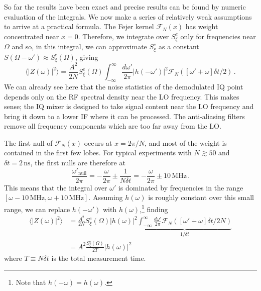 So far the results have been exact and precise results can be found by numeric evaluation of the integrals.
We now make a series of relatively weak assumptions to arrive at a practical formula.
The Fejer kernel $\mathcal{F}_N(x)$ has weight concentrated near $x=0$.
Therefore, we integrate over $S^e_\xi$ only for frequencies near $\Omega$ and so, in this integral, we can approximate $S^e_\xi$ as a constant $S(\Omega - \omega') \approx S^e_\xi(\Omega)$, giving
\begin{equation}
\langle |Z(\omega)|^2 \rangle =
\frac{A^2}{2N} S^e_\xi(\Omega) \int_{-\infty}^\infty \frac{d\omega'}{2\pi} |h(-\omega')|^2 \mathcal{F}_N([\omega' + \omega]\delta t / 2) \, .
\end{equation}
We can already see here that the noise statistics of the demodulated IQ point depends only on the RF spectral density near the LO frequency.
This makes sense; the IQ mixer is designed to take signal content near the LO frequency and bring it down to a lower IF where it can be processed.
The anti-aliasing filters remove all frequency components which are too far away from the LO.

The first null of $\mathcal{F}_N(x)$ occurs at $x = 2\pi / N$, and most of the weight is contained in the first few lobes.
For typical experiments with $N \gtrsim 50$ and $\delta t = 2 \, \text{ns}$, the first nulls are therefore at
\begin{equation}
\frac{\omega'_{\text{null}}}{2\pi}
= - \frac{\omega}{2\pi} \pm \frac{1}{N \delta t}
= - \frac{\omega}{2\pi} \pm 10 \, \text{MHz} \, .
\end{equation}
This means that the integral over $\omega'$ is dominated by frequencies in the range $[\omega - 10\,\text{MHz}, \omega + 10 \, \text{MHz}]$.
Assuming $h(\omega)$ is roughly constant over this small range, we can replace $h(-\omega')$ with $h(\omega)$,\footnote{Note that $h(-\omega) = h(\omega)$.} finding
\begin{align}
\langle |Z(\omega)|^2 \rangle
&= \frac{A^2}{2N}S^e_\xi(\Omega)|h(\omega)|^2
\underbrace{
\int_{-\infty}^\infty \frac{d\omega'}{2\pi} \mathcal{F}_N([\omega' + \omega] \delta t / 2 N)
}_{1 / \delta t} \\
&= A^2 \frac{S^e_\xi(\Omega)}{2 T} |h(\omega)|^2
\end{align}
where $T \equiv N \delta t$ is the total measurement time.


